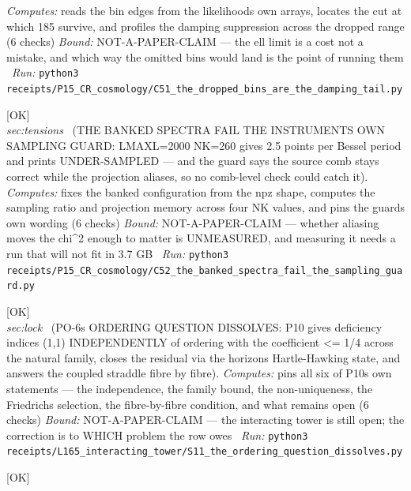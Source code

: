 \begin{description}
\emph{Computes:} reads the bin edges from the likelihoods own arrays, locates the cut at which 185 survive, and profiles the damping suppression across the dropped range (6 checks)
 \emph{Bound:} NOT-A-PAPER-CLAIM --- the ell limit is a cost not a mistake, and which way the omitted bins would land is the point of running them
\ \emph{Run:} \texttt{python3 receipts/P15\_CR\_cosmology/C51\_the\_dropped\_bins\_are\_the\_damping\_tail.py}
\item[\label{rcpt:C52_the_banked_spectra_fail_the_sampling_guard}\texttt{C52\_the\_banked\_spectra\_fail\_the\_sampling\_guard}]\hfill\textsf{[OK]}\\
\textit{sec:tensions} \ (THE BANKED SPECTRA FAIL THE INSTRUMENTS OWN SAMPLING GUARD: LMAXL=2000 NK=260 gives 2.5 points per Bessel period and prints UNDER-SAMPLED --- and the guard says the source comb stays correct while the projection aliases, so no comb-level check could catch it). 
\emph{Computes:} fixes the banked configuration from the npz shape, computes the sampling ratio and projection memory across four NK values, and pins the guards own wording (6 checks)
 \emph{Bound:} NOT-A-PAPER-CLAIM --- whether aliasing moves the chi\textasciicircum{}2 enough to matter is UNMEASURED, and measuring it needs a run that will not fit in 3.7 GB
\ \emph{Run:} \texttt{python3 receipts/P15\_CR\_cosmology/C52\_the\_banked\_spectra\_fail\_the\_sampling\_guard.py}
\item[\label{rcpt:S11_the_ordering_question_dissolves}\texttt{S11\_the\_ordering\_question\_dissolves}]\hfill\textsf{[OK]}\\
\textit{sec:lock} \ (PO-6s ORDERING QUESTION DISSOLVES: P10 gives deficiency indices (1,1) INDEPENDENTLY of ordering with the coefficient <= 1/4 across the natural family, closes the residual via the horizons Hartle-Hawking state, and answers the coupled straddle fibre by fibre). 
\emph{Computes:} pins all six of P10s own statements --- the independence, the family bound, the non-uniqueness, the Friedrichs selection, the fibre-by-fibre condition, and what remains open (6 checks)
 \emph{Bound:} NOT-A-PAPER-CLAIM --- the interacting tower is still open; the correction is to WHICH problem the row owes
\ \emph{Run:} \texttt{python3 receipts/L165\_interacting\_tower/S11\_the\_ordering\_question\_dissolves.py}
\item[\label{rcpt:P10_ordering_selection_is_external}\texttt{P10\_ordering\_selection\_is\_external}]\hfill\textsf{[OK]}\\

\end{description}
